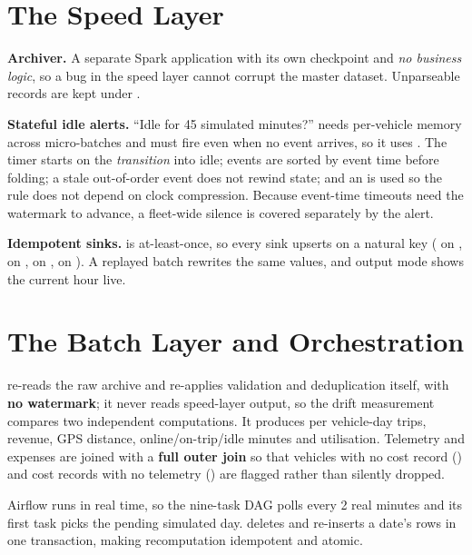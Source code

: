\section{The Speed Layer}
\label{sec:impl-speed}

\textbf{Archiver.} \label{sec:impl-archiver} A separate Spark application
with its own checkpoint and \emph{no business logic}, so a bug in the
speed layer cannot corrupt the master dataset. Unparseable records are
kept under .

\textbf{Stateful idle alerts.} \label{sec:impl-idle} ``Idle for 45
simulated minutes?'' needs per-vehicle memory across micro-batches and
must fire even when no event arrives, so it uses
. The timer starts on the
\emph{transition} into idle; events are sorted by event time before
folding; a stale out-of-order event does not rewind state; and an
 is used so the rule does not depend on clock
compression. Because event-time timeouts need the watermark to advance, a
fleet-wide silence is covered separately by the
 alert.

\textbf{Idempotent sinks.} \label{sec:impl-sinks}  is
at-least-once, so every sink upserts on a natural key
( on , 
on ,  on
,  on
). A replayed batch rewrites the same
values, and  output mode shows the current hour live.

\section{The Batch Layer and Orchestration}
\label{sec:impl-batch}
\label{sec:impl-trust}

 re-reads the raw archive and re-applies
validation and deduplication itself, with \textbf{no watermark}; it never
reads speed-layer output, so the drift measurement compares two
independent computations. It produces per vehicle-day trips, revenue,
GPS distance, online/on-trip/idle minutes and utilisation. Telemetry and
expenses are joined with a \textbf{full outer join} so that vehicles with
no cost record () and cost records with no telemetry
() are flagged rather than silently dropped.

Airflow runs in real time, so the nine-task DAG polls every 2 real
minutes and its first task picks the pending simulated day.
 deletes and re-inserts a date's rows in one
transaction, making recomputation idempotent and atomic.

